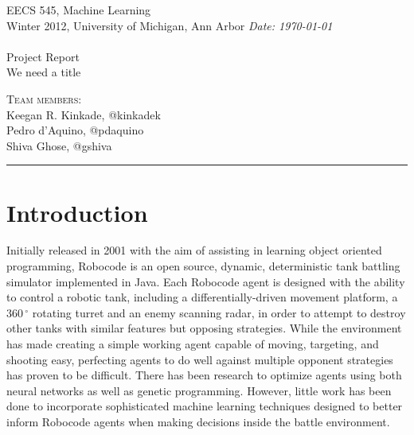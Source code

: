 \documentclass{article}
\newcommand{\shortbar}{\begin{center}\rule{5ex}{0.1pt}\end{center}}
\newcommand{\courseNumber}{EECS 545}
\newcommand{\courseTitle}{Machine Learning}
\newcommand{\semester}{Winter 2012}
\theoremstyle{plain}
\theoremstyle{definition}
\theoremstyle{remark}
\newenvironment{solution}[1]{\medskip\noindent{\bf Problem #1.~}}{\shortbar}
\newcommand{\solutions}[4]{
\vspace{-2ex}
\begin{center}
{\small  \courseNumber, \courseTitle
\hfill {\Large \bf {#1} }\\
\semester, University of Michigan, Ann Arbor \hfill
{\em Date: #3}}\\
\vspace{-1ex}
\hrulefill\\
\vspace{4ex}
{\normalsize Project Report}\\
{\LARGE  #2}\\
\vspace{2ex}
\end{center}
\begin{trivlist}
\item \textsc{Team members:} {#4}
\end{trivlist}
\noindent
\vspace{-1cm}
\shortbar
\vspace{-0.5cm}
}
\begin{document}
\solutions{}{We need a title}{\today}{\\ Keegan R. Kinkade, @kinkadek\\ Pedro d'Aquino, @pdaquino \\Shiva Ghose, @gshiva }
%
%

\begin{abstract}

In order for artificial intelligence agents to autonomously operate within a given environment, they must be capable of processing perceptual knowledge in such a manner as to maximize their performance measure \cite{russelnorvig}. For a competitively driven AI agent, this becomes increasingly important as the inability to intelligently process perceptual information will ultimately lead to defeat by those who are capable of such computation. To this end, the following describes the implementation of sophisticated machine learning techniques in an artificially driven tank battle simulator. Armed with such techniques, it is the goal of this project to provide a competitive, autonomous AI agent with the ability to determine how to best evade an opponent's attacks while striking in such a manner as to maximize the possibility of destroying the enemy. 

\end{abstract}

\section{Introduction}

Initially released in 2001 with the aim of assisting in learning object oriented programming, Robocode is an open source, dynamic, deterministic tank battling simulator implemented in Java. Each Robocode agent is designed with the ability to control a robotic tank, including a differentially-driven movement platform, a $360\,^{\circ}\mathrm{}$ rotating turret and an enemy scanning radar, in order to attempt to destroy other tanks with similar features but opposing strategies. While the environment has made creating a simple working agent capable of moving, targeting, and shooting easy, perfecting agents to do well against multiple opponent strategies has proven to be difficult. There has been research to optimize agents using both neural networks as well as genetic programming. However, little work has been done to incorporate sophisticated machine learning techniques designed to better inform Robocode agents when making decisions inside the battle environment.
\end{document}
